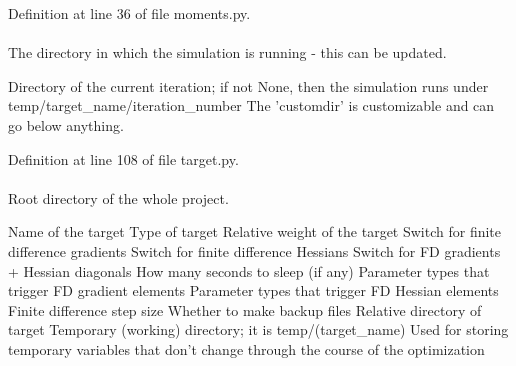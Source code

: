 \-Definition at line 36 of file moments.\-py.

\hypertarget{classforcebalance_1_1target_1_1Target_a1da470037ef61c22dc44beb85cfa01a9}{
\paragraph[{rundir}]{}}\label{classforcebalance_1_1target_1_1Target_a1da470037ef61c22dc44beb85cfa01a9}


\-The directory in which the simulation is running -\/ this can be updated. 

\-Directory of the current iteration; if not \-None, then the simulation runs under temp/target\-\_\-name/iteration\-\_\-number \-The 'customdir' is customizable and can go below anything.

\-Definition at line 108 of file target.\-py.

\hypertarget{classforcebalance_1_1target_1_1Target_aede2856573b890cd47054ad36937d6f6}{
\paragraph[{tempdir}]{}}\label{classforcebalance_1_1target_1_1Target_aede2856573b890cd47054ad36937d6f6}


\-Root directory of the whole project. 

\-Name of the target \-Type of target \-Relative weight of the target \-Switch for finite difference gradients \-Switch for finite difference \-Hessians \-Switch for \-F\-D gradients + \-Hessian diagonals \-How many seconds to sleep (if any) \-Parameter types that trigger \-F\-D gradient elements \-Parameter types that trigger \-F\-D \-Hessian elements \-Finite difference step size \-Whether to make backup files \-Relative directory of target \-Temporary (working) directory; it is temp/(target\-\_\-name) \-Used for storing temporary variables that don't change through the course of the optimization 

